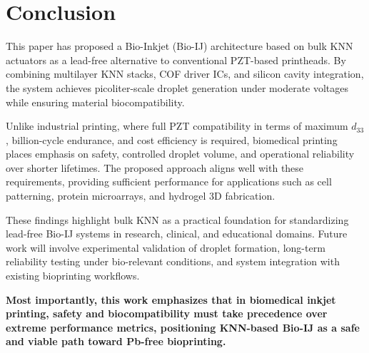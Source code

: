 \section{Conclusion}
This paper has proposed a Bio-Inkjet (Bio-IJ) architecture based on
bulk KNN actuators as a lead-free alternative to conventional PZT-based
printheads.
By combining multilayer KNN stacks, COF driver ICs, and silicon cavity
integration, the system achieves picoliter-scale droplet generation
under moderate voltages while ensuring material biocompatibility.

Unlike industrial printing, where full PZT compatibility in terms of
maximum $d_{33}$, billion-cycle endurance, and cost efficiency is
required, biomedical printing places emphasis on safety, controlled
droplet volume, and operational reliability over shorter lifetimes.
The proposed approach aligns well with these requirements, providing
sufficient performance for applications such as cell patterning,
protein microarrays, and hydrogel 3D fabrication.

These findings highlight bulk KNN as a practical foundation for
standardizing lead-free Bio-IJ systems in research, clinical, and
educational domains.
Future work will involve experimental validation of droplet formation,
long-term reliability testing under bio-relevant conditions, and system
integration with existing bioprinting workflows.

\textbf{Most importantly, this work emphasizes that in biomedical inkjet
printing, safety and biocompatibility must take precedence over extreme
performance metrics, positioning KNN-based Bio-IJ as a safe and viable
path toward Pb-free bioprinting.}
